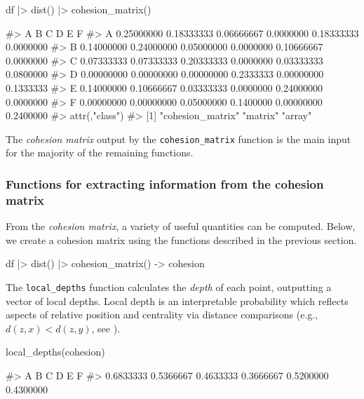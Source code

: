 \begin{Schunk}
\begin{Sinput}
df |>
  dist() |>
  cohesion_matrix()
\end{Sinput}
\begin{Soutput}
#>            A          B          C         D          E         F
#> A 0.25000000 0.18333333 0.06666667 0.0000000 0.18333333 0.0000000
#> B 0.14000000 0.24000000 0.05000000 0.0000000 0.10666667 0.0000000
#> C 0.07333333 0.07333333 0.20333333 0.0000000 0.03333333 0.0800000
#> D 0.00000000 0.00000000 0.00000000 0.2333333 0.00000000 0.1333333
#> E 0.14000000 0.10666667 0.03333333 0.0000000 0.24000000 0.0000000
#> F 0.00000000 0.00000000 0.05000000 0.1400000 0.00000000 0.2400000
#> attr(,"class")
#> [1] "cohesion_matrix" "matrix"          "array"
\end{Soutput}
\end{Schunk}

The \emph{cohesion matrix} output by the \texttt{cohesion\_matrix}
function is the main input for the majority of the remaining functions.

\hypertarget{functions-for-extracting-information-from-the-cohesion-matrix}{%
\subsubsection{Functions for extracting information from the cohesion
matrix}\label{functions-for-extracting-information-from-the-cohesion-matrix}}

From the \emph{cohesion matrix}, a variety of useful quantities can be
computed. Below, we create a cohesion matrix using the functions
described in the previous section.

\begin{Schunk}
\begin{Sinput}
df |>
  dist() |>
  cohesion_matrix() -> cohesion
\end{Sinput}
\end{Schunk}

The \texttt{local\_depths} function calculates the \emph{depth} of each
point, outputting a vector of local depths. Local depth is an
interpretable probability which reflects aspects of relative position
and centrality via distance comparisons (e.g., \(d(z, x) < d(z, y)\),
see \citet{berenhaut2022social}).

\begin{Schunk}
\begin{Sinput}
local_depths(cohesion)
\end{Sinput}
\begin{Soutput}
#>         A         B         C         D         E         F
#> 0.6833333 0.5366667 0.4633333 0.3666667 0.5200000 0.4300000
\end{Soutput}
\end{Schunk}

